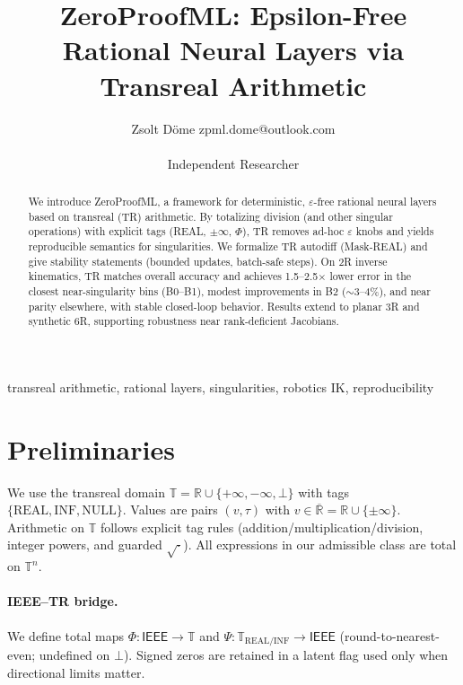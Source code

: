 \documentclass[11pt,twoside]{article}
\title{ZeroProofML: Epsilon-Free Rational Neural Layers via Transreal Arithmetic}
\author{\name Zsolt D\"ome \email zpml.dome@outlook.com \\\\
\addr Independent Researcher}
\begin{document}
\maketitle

\begin{abstract}
We introduce ZeroProofML, a framework for deterministic, $\varepsilon$-free rational neural layers based on transreal (TR) arithmetic. By totalizing division (and other singular operations) with explicit tags (REAL, $\pm\infty$, $\Phi$), TR removes ad-hoc $\varepsilon$ knobs and yields reproducible semantics for singularities. We formalize TR autodiff (Mask-REAL) and give stability statements (bounded updates, batch-safe steps). On 2R inverse kinematics, TR matches overall accuracy and achieves 1.5--2.5$\times$ lower error in the closest near-singularity bins (B0--B1), modest improvements in B2 ($\sim$3--4\%), and near parity elsewhere, with stable closed-loop behavior. Results extend to planar 3R and synthetic 6R, supporting robustness near rank-deficient Jacobians.
\end{abstract}

\begin{keywords}
transreal arithmetic, rational layers, singularities, robotics IK, reproducibility
\end{keywords}

\section{Preliminaries}
We use the transreal domain $\mathbb{T}=\mathbb{R}\cup\{+\infty,-\infty,\bot\}$ with tags $\{\mathrm{REAL},\mathrm{INF},\mathrm{NULL}\}$. Values are pairs $(v,\tau)$ with $v\in\overline{\mathbb{R}}=\mathbb{R}\cup\{\pm\infty\}$. Arithmetic on $\mathbb{T}$ follows explicit tag rules (addition/multiplication/division, integer powers, and guarded $\sqrt{\cdot}$). All expressions in our admissible class are total on $\mathbb{T}^n$.

\paragraph{IEEE--TR bridge.} We define total maps $\Phi:\mathsf{IEEE}\to\mathbb{T}$ and $\Psi:\mathbb{T}_{\mathrm{REAL/INF}}\to\mathsf{IEEE}$ (round-to-nearest-even; undefined on $\bot$). Signed zeros are retained in a latent flag used only when directional limits matter.
\end{document}
